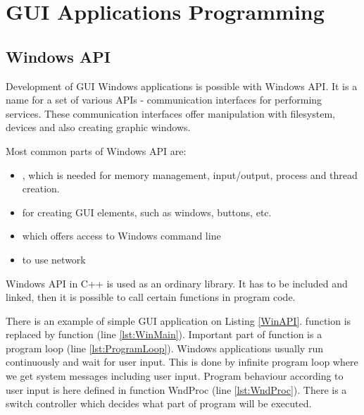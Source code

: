 \chapter*{GUI Applications Programming}
\vspace{-10mm}


\section*{Windows API}

Development of GUI Windows applications is possible with Windows API. It is a name for a set of various APIs - communication interfaces for performing services. These communication interfaces offer manipulation with filesystem, devices and also creating graphic windows.

Most common parts of Windows API are:
\begin{itemize}
\item {}, which is needed for memory management, input/output, process and thread creation.
\item {} for creating GUI elements, such as windows, buttons, etc.
\item {} which offers access to Windows command line
\item {} to use network
\end{itemize}

Windows API in C++ is used as an ordinary library. It has to be included and linked, then it is possible to call certain functions in program code.

There is an example of simple GUI application on Listing \ref{WinAPI}.  function is replaced by  function (line \ref{lst:WinMain}). Important part of  function is a program loop (line \ref{lst:ProgramLoop}). Windows applications usually run continuously and wait for user input. This is done by infinite program loop where we get system messages including user input. Program behaviour according to user input is here defined in function WndProc (line \ref{lst:WndProc}). There is a switch controller which decides what part of program will be executed.

